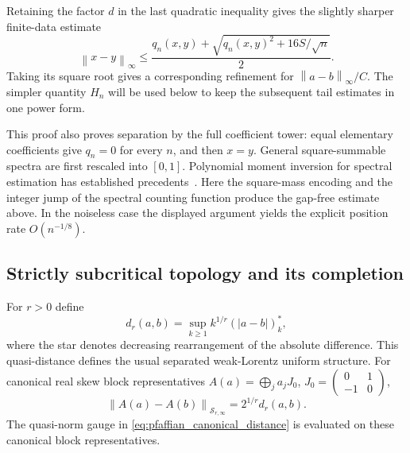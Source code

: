\documentclass[11pt,a4paper]{amsart}
\numberwithin{equation}{section}
\theoremstyle{definition}
\theoremstyle{remark}
\newcommand{\Sch}{\mathcal S}
\newcommand{\norm}[1]{\left\lVert#1\right\rVert}
\begin{document}
Retaining the factor $d$ in the last quadratic inequality gives the slightly sharper finite-data estimate
\begin{equation}\label{eq:pfaffian_quadratic_refinement}
 \norm{x-y}_\infty
 \le\frac{q_n(x,y)+\sqrt{q_n(x,y)^2+16S/\sqrt n}}2.
\end{equation}
Taking its square root gives a corresponding refinement for $\norm{a-b}_\infty/C$. The simpler quantity $H_n$ will be used below to keep the subsequent tail estimates in one power form.

This proof also proves separation by the full coefficient tower: equal elementary coefficients give $q_n=0$ for every $n$, and then $x=y$. General square-summable spectra are first rescaled into $[0,1]$. Polynomial moment inversion for spectral estimation has established precedents~\cite{KongValiant}. Here the square-mass encoding and the integer jump of the spectral counting function produce the gap-free estimate above. In the noiseless case the displayed argument yields the explicit position rate $O(n^{-1/8})$.

\subsection{Strictly subcritical topology and its completion}
For $r>0$ define
\begin{equation}\label{eq:pfaffian_weak_distance}
 d_r(a,b)=\sup_{k\ge1}k^{1/r}(|a-b|)^*_k,
\end{equation}
where the star denotes decreasing rearrangement of the absolute difference. This quasi-distance defines the usual separated weak-Lorentz uniform structure. For canonical real skew block representatives
$A(a)=\bigoplus_j a_jJ_0$, $J_0=\left(\begin{smallmatrix}0&1\\-1&0\end{smallmatrix}\right)$,
\begin{equation}\label{eq:pfaffian_canonical_distance}
 \norm{A(a)-A(b)}_{\Sch_{r,\infty}}=2^{1/r}d_r(a,b).
\end{equation}
The quasi-norm gauge in \eqref{eq:pfaffian_canonical_distance} is evaluated on these canonical block representatives.
\end{document}
